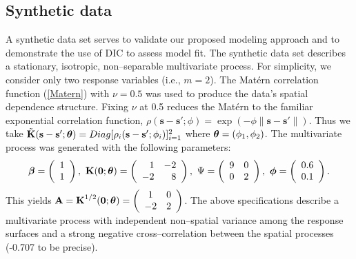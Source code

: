 \documentclass[a4paper]{article}
\newcommand{\bbeta}{ \mbox{\boldmath $ \beta $} }
\newcommand{\bphi}{ \mbox{\boldmath $\phi$}}
\newcommand{\btheta}{ \mbox{\boldmath $ \theta $} }
\newcommand{\bzero}{\textbf{0}}
\newcommand{\bA}{\textbf{A}}
\newcommand{\bK}{\textbf{K}}
\newcommand{\bs}{\textbf{s}}
\begin{document}
\subsection{Synthetic data}\label{SyntheticData}
A synthetic data set serves to validate our proposed modeling
approach and to demonstrate the use of DIC to assess model fit.
The synthetic data set describes a stationary, isotropic,
non--separable multivariate process. For simplicity, we consider
only two response variables (i.e., $m=2$). The Mat\'{e}rn
correlation function (\ref{Matern}) with $\nu=0.5$ was used
to produce the data's spatial dependence structure. Fixing $\nu$
at 0.5 reduces the Mat\'{e}rn to the familiar exponential
correlation function, $\rho(\bs-\bs';\phi) = \exp(-\phi
\|\bs-\bs'\|)$. Thus we take
$\tilde{\bK}(\bs-\bs';\btheta)=Diag[\rho_i(\bs-\bs';\phi_i)]_{i=1}^{2}$
where $\btheta=(\phi_1,\phi_2)$. The multivariate process was
generated with the following parameters:
\begin{align*}
\bbeta =\left(
            \begin{array}{c}
            1\\
            1\\
            \end{array}
        \right),
\text{ }\bK(\bzero;\btheta) =\left(
            \begin{array}{rr}
            1 &  -2\\
            -2 & 8\\
            \end{array}
        \right),
\text{ }\Psi =\left(
            \begin{array}{cc}
            9 & 0\\
            0 & 2 \\
            \end{array}
        \right),
\text{ }\bphi = \left(
            \begin{array}{c}
            0.6\\
            0.1\\
            \end{array}
        \right).
\end{align*}
This yields $\bA=\bK^{1/2}(\bzero;\btheta)=\left(%
\begin{array}{cc}
  1 & 0 \\
  -2 & 2 \\
\end{array}%
\right)$. The above specifications describe a multivariate process
with independent non--spatial variance among the response surfaces
and a strong negative cross--correlation between the spatial
processes (-0.707 to be precise).
\end{document}
